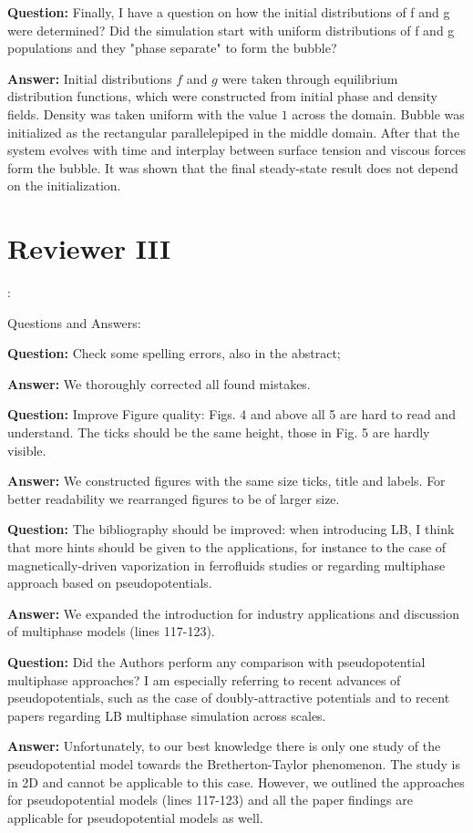 \documentclass{article}
\begin{document}
\textbf{Question:} Finally, I have a question on how the initial distributions of f and g were determined?  Did the
simulation start with uniform distributions of f and g populations and they "phase separate" to form
the bubble?

\textbf{Answer:} Initial distributions $f$ and $g$ were taken through equilibrium distribution
functions, which were constructed from initial phase and density fields. Density was taken uniform
with the value $1$ across the domain. Bubble was initialized as the rectangular parallelepiped in
the middle domain. After that the system evolves with time and interplay between surface tension
and viscous forces form the bubble. It was shown \cite{kuzmin-binary2d} that the final steady-state
result does not depend on the initialization. 
 
\section{Reviewer III}:

Questions and Answers:

\textbf{Question:} Check some spelling errors, also in the abstract;

\textbf{Answer:} We thoroughly corrected all found mistakes.

\textbf{Question:}  Improve Figure quality: Figs. 4 and above all 5 are hard to read and understand. The ticks should
be the same height, those in Fig. 5 are hardly visible.

\textbf{Answer:} We constructed figures with the same size ticks, title and labels. For better
readability we rearranged figures to be of larger size.

\textbf{Question:}  The bibliography should be improved: when introducing LB, I think that more hints should be given
to the applications, for instance to the case of magnetically-driven vaporization in ferrofluids
studies or regarding multiphase approach based on pseudopotentials.

\textbf{Answer:} We expanded the introduction for industry applications and discussion of
multiphase models (lines 117-123).

\textbf{Question:} Did the Authors perform any comparison with pseudopotential multiphase approaches? I am
especially referring to recent advances of pseudopotentials, such as the case of doubly-attractive
potentials and to recent papers regarding LB multiphase simulation across scales.

\textbf{Answer:} Unfortunately, to our best knowledge there is only one study of the pseudopotential
model towards the Bretherton-Taylor phenomenon. The study is in 2D and cannot be applicable to this
case. However, we outlined the approaches for pseudopotential models (lines 117-123) and all the paper findings are applicable for pseudopotential models as well.
\end{document}
